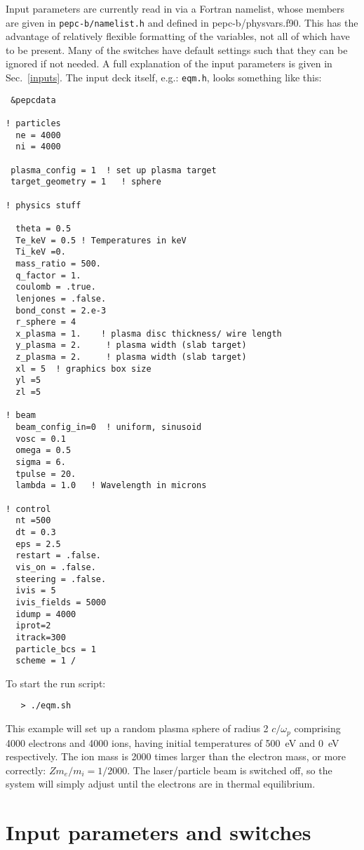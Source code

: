 \documentclass[12pt,psfig]{article}
\begin{document}
\medskip\noindent
Input parameters are currently read in via a Fortran namelist, whose members
are given in {\tt pepc-b/namelist.h} and defined in pepc-b/physvars.f90.  This has the advantage of relatively
flexible formatting of the variables, not all of which have to be present.
Many of the switches have default settings such that they can be ignored if
not needed.  A full explanation of the input parameters is given in
Sec.~\ref{inputs}. The input deck itself, e.g.: {\tt eqm.h}, looks something
like this:
\small
\begin{verbatim}
 &pepcdata

! particles
  ne = 4000
  ni = 4000

 plasma_config = 1  ! set up plasma target
 target_geometry = 1   ! sphere

! physics stuff

  theta = 0.5
  Te_keV = 0.5 ! Temperatures in keV
  Ti_keV =0.
  mass_ratio = 500.
  q_factor = 1.
  coulomb = .true.
  lenjones = .false.
  bond_const = 2.e-3
  r_sphere = 4
  x_plasma = 1.    ! plasma disc thickness/ wire length
  y_plasma = 2.     ! plasma width (slab target)
  z_plasma = 2.     ! plasma width (slab target)
  xl = 5  ! graphics box size
  yl =5
  zl =5

! beam
  beam_config_in=0  ! uniform, sinusoid
  vosc = 0.1
  omega = 0.5
  sigma = 6.
  tpulse = 20.
  lambda = 1.0   ! Wavelength in microns

! control
  nt =500
  dt = 0.3
  eps = 2.5
  restart = .false.
  vis_on = .false.
  steering = .false.
  ivis = 5
  ivis_fields = 5000
  idump = 4000
  iprot=2
  itrack=300
  particle_bcs = 1
  scheme = 1 /
\end{verbatim}

\normalsize

\noindent
To start the run script:
\begin{verbatim}
   > ./eqm.sh
\end{verbatim}

\noindent
This example will set up a random plasma sphere of radius 2 $c/\omega_p$ comprising 4000 electrons and
4000 ions, having initial temperatures of 500~eV and 0~eV respectively. The
ion mass is 2000 times larger than the electron mass, or more correctly:
$Zm_e/m_i = 1/2000$.  The laser/particle beam is switched off, so the system
will simply adjust until the electrons are in thermal equilibrium.

\section{Input parameters and switches \label{inputs}}
\end{document}
